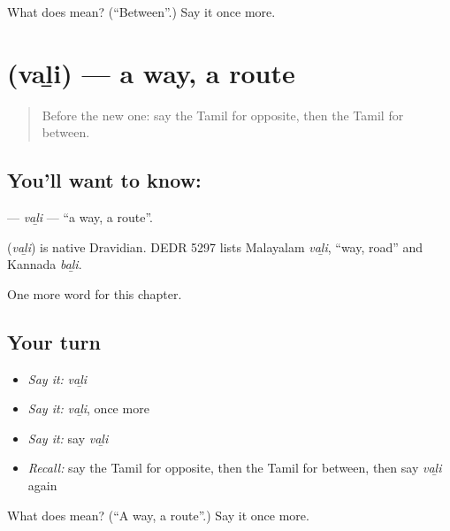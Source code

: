 \begin{tcolorbox}[breakable,colback=teal!4,colframe=teal!35!black,title={Before you move on}]
What does  mean? (\textquotedblleft{}Between\textquotedblright{}.) Say it once more.
\end{tcolorbox}
\section[\texorpdfstring{\ta{வழி} (vaḻi)}{வழி (vaḻi)}]{ (vaḻi) — a way, a route}

\label{lesson:TA-C264-vali}



\begin{quote}
Before the new one: say the Tamil for opposite, then the Tamil for between.
\end{quote}

\subsection*{You'll want to know: }
\textbf{} — \emph{vaḻi} — \textquotedblleft{}a way, a route\textquotedblright{}.

\begin{cousinweb}
\textbf{} (\emph{vaḻi}) is native Dravidian. DEDR 5297 lists Malayalam \emph{vaḻi}, \textquotedblleft{}way, road\textquotedblright{} and Kannada \emph{baḻi}.
\end{cousinweb}

\begin{grammarlens}[title={What you've built}]
One more word for this chapter.
\end{grammarlens}

\subsection*{Your turn}
\begin{itemize}
\raggedright
  \item \emph{Say it:} \emph{vaḻi}
  \item \emph{Say it:} \emph{vaḻi}, once more
  \item \emph{Say it:} say \emph{vaḻi}
  \item \emph{Recall:} say the Tamil for opposite, then the Tamil for between, then say \emph{vaḻi} again
\end{itemize}

\begin{tcolorbox}[breakable,colback=teal!4,colframe=teal!35!black,title={Before you move on}]
What does  mean? (\textquotedblleft{}A way, a route\textquotedblright{}.) Say it once more.
\end{tcolorbox}
